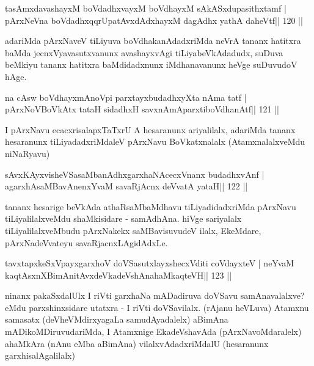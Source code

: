 \begin{shl}
tasAmxdavashayxM boVdadhxvayxM boVdhayxM sAkASxdupasithxtamf |
pArxNeVna boVdadhxqqrUpatAvxdAdxhayxM dagAdhx yathA daheVtf\hfill || 120 ||
\end{shl}

\begin{artha}
adariMda pArxNaveV tiLiyuva boVdhakanAdadxriMda neVrA tananx hatitxra  baMda jecnxVyavasutxvanunx avashayxvAgi tiLiyabeVkAdadudx, suDuva beMkiyu tananx hatitxra baMdidadxnunx iMdhanavanunx heVge suDuvudoV hAge.
\end{artha}

\begin{shl}
na cAsw boVdhayxmAnoV\s pi parxtayxbudadhxyXta nAma tatf |
pArxNoV\s BoVkAtx tataH sidadhxH savxnAmAparxtiboVdhanAtf\hfill || 121 ||
\end{shl}

\begin{artha}
I pArxNavu ecacxrisalapxTaTxrU A hesaranunx ariyalilalx, adariMda tananx hesaranunx tiLiyadadxriMdaleV pArxNavu BoVkatxnalalx (AtamxnalalxveMdu niNaRyavu)
\end{artha}

\begin{shl}
sAvxKAyxvisheVSasaMbanAdhxgarxhaNAcecxVnanx budadhxvAnf |
agarxhAsaMBavAnenxYvaM savaRjAcnx deVvatA yataH\hfill || 122 ||
\end{shl}

\begin{artha}
tananx hesarige beVkAda athaRsaMbaMdhavu tiLiyadidadxriMda pArxNavu  tiLiyalilalxveMdu shaMkisidare - samAdhAna. hiVge sariyalalx  tiLiyalilalxveMbudu pArxNakekx saMBavisuvudeV ilalx, EkeMdare, pArxNadeVvateyu savaRjacnxLAgidAdxLe.
\end{artha}


\begin{shl}
tavxtapxkeSxV\s payxgarxhoV doVSasutxlayxshecxVditi coVdayxteV |
neYvaM kaqtAsxnXBimAnitAvxdeVkadeVshAnahaMkaqteVH\hfill || 123 ||
\end{shl}

\begin{artha}
ninanx pakaSxdalUlx I riVti garxhaNa mADadiruva doVSavu samAnavalalxve? eMdu parxshinxsidare utatxra - I riVti doVSavilalx. (rAjanu heVLuva) Atamxnu samasatx (deVheVMdirxyagaLa samudAyadalelx) aBimAna mADikoMDiruvudariMda, I Atamxnige EkadeVshavAda (pArxNavoMdaralelx) ahaMkAra (nAnu eMba aBimAna) vilalxvAdadxriMdalU (hesaranunx garxhisalAgalilalx) 
\end{artha} 

